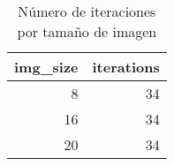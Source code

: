 \begin{table}
\caption{Número de iteraciones por tamaño de imagen}
\label{tab:iteraciones}
\begin{tabular}{rr}
\toprule
img_size & iterations \\
\midrule
8 & 34 \\
16 & 34 \\
20 & 34 \\
\bottomrule
\end{tabular}
\end{table}
